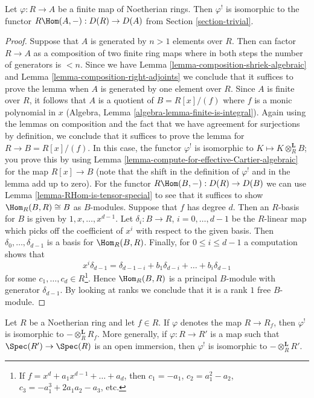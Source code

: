 \begin{lemma}
\label{lemma-upper-shriek-finite}
Let $\varphi : R \to A$ be a finite map of Noetherian rings.
Then $\varphi^!$ is isomorphic to the functor
$R\Hom(A, -) : D(R) \to D(A)$ from
Section \ref{section-trivial}.
\end{lemma}

\begin{proof}
Suppose that $A$ is generated by $n > 1$ elements over $R$.
Then can factor $R \to A$ as a composition of two finite ring maps
where in both steps the number of generators is $< n$.
Since we have Lemma \ref{lemma-composition-shriek-algebraic} and
Lemma \ref{lemma-composition-right-adjoints}
we conclude that it suffices
to prove the lemma when $A$ is generated by one element over $R$.
Since $A$ is finite over $R$, it follows that $A$ is a quotient
of $B = R[x]/(f)$ where $f$ is a monic polynomial in $x$
(Algebra, Lemma \ref{algebra-lemma-finite-is-integral}).
Again using the lemmas on composition and the fact that we
have agreement for surjections by definition, we conclude that
it suffices to prove the lemma for $R \to B = R[x]/(f)$.
In this case, the functor $\varphi^!$ is isomorphic to
$K \mapsto K \otimes_R^\mathbf{L} B$; you prove this by
using Lemma \ref{lemma-compute-for-effective-Cartier-algebraic}
for the map $R[x] \to B$ (note that the shift in the definition
of $\varphi^!$ and in the lemma add up to zero).
For the functor $R\Hom(B, -) : D(R) \to D(B)$ we can use
Lemma \ref{lemma-RHom-is-tensor-special}
to see that it suffices to show $\Hom_R(B, R) \cong B$
as $B$-modules. Suppose that $f$ has degree $d$.
Then an $R$-basis for $B$ is given by $1, x, \ldots, x^{d - 1}$.
Let $\delta_i : B \to R$, $i = 0, \ldots, d - 1$
be the $R$-linear map which picks off the coefficient
of $x^i$ with respect to the given basis. Then
$\delta_0, \ldots, \delta_{d - 1}$ is a basis for $\Hom_R(B, R)$.
Finally, for $0 \leq i \leq d - 1$ a computation shows that
$$
x^i \delta_{d - 1} =
\delta_{d - 1 - i} + b_1 \delta_{d - i} + \ldots + b_i \delta_{d - 1}
$$
for some $c_1, \ldots, c_d \in R$\footnote{If
$f = x^d + a_1 x^{d - 1} + \ldots + a_d$, then
$c_1 = -a_1$, $c_2 = a_1^2 - a_2$, $c_3 = -a_1^3 + 2a_1a_2 -a_3$, etc.}.
Hence $\Hom_R(B, R)$ is a principal $B$-module with generator
$\delta_{d - 1}$. By looking
at ranks we conclude that it is a rank $1$ free $B$-module.
\end{proof}

\begin{lemma}
\label{lemma-upper-shriek-localize}
Let $R$ be a Noetherian ring and let $f \in R$.
If $\varphi$ denotes the map $R \to R_f$, then $\varphi^!$
is isomorphic to $- \otimes_R^\mathbf{L} R_f$.
More generally, if $\varphi : R \to R'$ is a map such that
$\Spec(R') \to \Spec(R)$ is an open immersion, then
$\varphi^!$ is isomorphic to $- \otimes_R^\mathbf{L} R'$.
\end{lemma}

